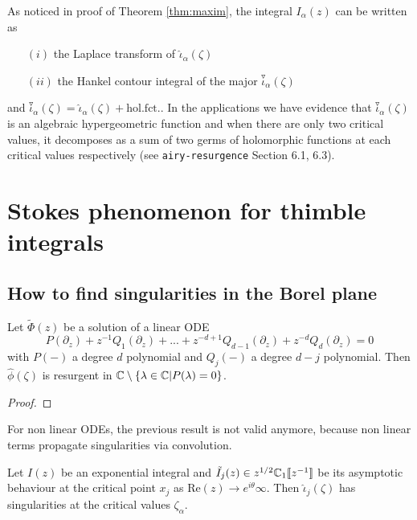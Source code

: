 \documentclass[11pt,a4paper,twoside,leqno,noamsfonts]{amsart}
\numberwithin{equation}{section}
\begin{document}
As noticed in proof of Theorem \ref{thm:maxim}, the integral $I_{\alpha}(z)$ can be written as 
\begin{enumerate}
\item[$(i)$] the Laplace transform of $\hat{\iota}_{\alpha}(\zeta)$
\item[$(ii)$] the Hankel contour integral of the major $\overset{\triangledown}{\iota}_\alpha(\zeta)$
\end{enumerate}
and $\overset{\triangledown}{\iota}_\alpha(\zeta)=\hat{
\iota}_{\alpha}(\zeta)+\text{hol.fct.}$. In the applications we have evidence that $\overset{\triangledown}{\iota}_\alpha(\zeta)$ is an algebraic hypergeometric function and when there are only two critical values, it decomposes as a sum of two germs of holomorphic functions at each critical values respectively (see {\tt airy-resurgence} Section 6.1, 6.3). 

\section{Stokes phenomenon for thimble integrals}


\subsection{How to find singularities in the Borel plane}

\begin{lemma}
Let $\tilde{\Phi}(z)$ be a solution of a linear ODE
\begin{equation}
P(\partial_z)+z^{-1}Q_1(\partial_z)+...+z^{-d+1}Q_{d-1}(\partial_z)+z^{-d}Q_d(\partial_z)=0
\end{equation}
with $P(-)$ a degree $d$ polynomial and $Q_j(-)$ a degree $d-j$ polynomial. Then $\hat{\phi}(\zeta)$ is resurgent in $\mathbb C\setminus\lbrace \lambda\in\mathbb C \vert  P(\lambda)=0\rbrace$.  
\end{lemma}

\begin{proof}

\end{proof}

\begin{remark}
For non linear ODEs, the previous result is not valid anymore, because non linear terms propagate singularities via convolution. 
\end{remark}

\begin{lemma}Let $I(z)$ be an exponential integral and $\tilde{I}_j(z)\in z^{1/2}\mathbb C_1[\![z^{-1}]\!]$ be its asymptotic behaviour at the critical point $x_j$ as $\mathrm{Re}(z)\to e^{i\theta}\infty$. Then $\hat{\iota}_j(\zeta)$ has singularities at the critical values $\zeta_\alpha$. 
\end{lemma}
\end{document}
